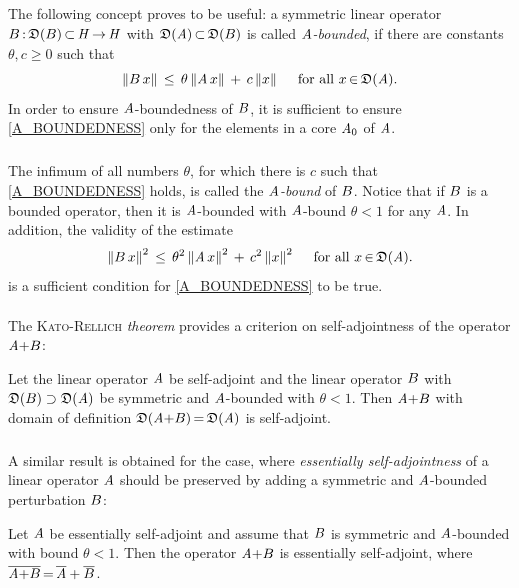 \documentclass[11pt,twoside]{article}
\begin{document}
\subparagraph{} %
The following concept proves to be useful:
a symmetric linear operator ${B} {\,:\,} \mathfrak{D}({B}) {\,\subset\,} \mathit{H} {\,\to\,} \mathit{H}$
with $\mathfrak{D}(\mathit{A}) {\,\subset\,} \mathfrak{D}({B})$
is called $\mathit{A}$\textit{-bounded},
if there are constants $\theta, c \geq 0$ such that
\begin{equation}\label{A_BOUNDEDNESS}
\left\lVert {B} \,x \right\rVert \, \leq \, \theta \left\lVert \mathit{A} \,x \right\rVert \, + \, c \left\lVert x \right\rVert
\quad \mbox{ for all } x {\,\in\,} \mathfrak{D}(\mathit{A}).
\end{equation}
In order to ensure $\mathit{A}$-boundedness of ${B}$,
it is sufficient to ensure \eqref{A_BOUNDEDNESS}
only for the elements in a core $\mathit{A}_0$ of $\mathit{A}$.

\subparagraph{} %
The infimum of all numbers $\theta$,
for which there is $c$ such that \eqref{A_BOUNDEDNESS} holds,
is called the $\mathit{A}$\textit{-bound} of ${B}$.
Notice that if ${B}$ is a bounded operator,
then it is $\mathit{A}$-bounded with $\mathit{A}$-bound $\theta <1$ for any $\mathit{A}$.
In addition,
the validity of the estimate
\[
\left\lVert {B} \,x \right\rVert^2 \, \leq \,
\theta^2 \left\lVert \mathit{A} \,x \right\rVert^2 \, + \, c^2 \left\lVert x \right\rVert^2
\quad \mbox{ for all } x {\,\in\,} \mathfrak{D}(\mathit{A}).
\]
is a sufficient condition for \eqref{A_BOUNDEDNESS} to be true.

\paragraph{} %
The \textsc{Kato-Rellich} \textit{theorem}
provides a criterion on self-adjoint\-ness of the operator $\mathit{A} {+} {B}$:

\begin{theorem}\label{KATO-RELLICH_THEOREM_1}
Let the linear operator $\mathit{A}$ be self-adjoint and 
the linear operator ${B}$ with $\mathfrak{D}({B}) \supset \mathfrak{D}(\mathit{A})$ 
be symmetric and $\mathit{A}$-bounded with $\theta < 1$.
Then $\mathit{A} {+} {B}$ with domain of definition 
$\mathfrak{D}(\mathit{A} {+} {B}) {\,=\,} \mathfrak{D}(\mathit{A})$ is self-adjoint.
\end{theorem}

\subparagraph{} %
A similar result is obtained for the case,
where \textit{essentially self-adjointness} of a linear operator $\mathit{A}$
should be preserved by adding
a symmetric and $\mathit{A}$-bounded perturbation ${B}$:

\begin{theorem}\label{KATO-RELLICH_THEOREM_2}
Let $\mathit{A}$ be essentially self-adjoint and assume that
${B}$ is symmetric and $\mathit{A}$-bounded with bound $\theta < 1$.
Then the operator $\mathit{A} {+} {B}$ is essentially self-adjoint,
where
$\overline{\mathit{A} {+} {B}} {\,=\,} \overline{\mathit{A}} + \overline{{B}}$.
\end{theorem}
\end{document}
